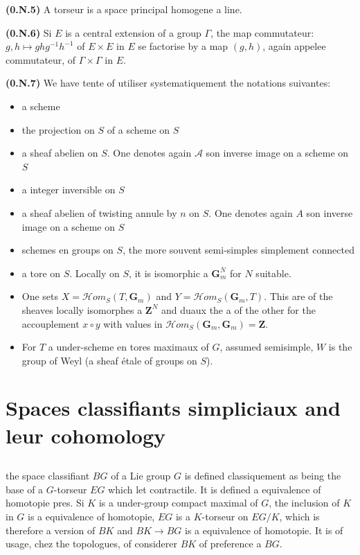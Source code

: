\documentclass[11pt,a4paper]{article}
\theoremstyle{plain}
\theoremstyle{definition}
\begin{document}
\textbf{(0.N.5)} A torseur is a space principal homogene a line.

\textbf{(0.N.6)} Si $E$ is a central extension of a group $\Gamma$, the map commutateur: $g,h \mapsto ghg^{-1}h^{-1}$ of $E \times E$ in $E$ se factorise by a map $(g,h)$, again appelee commutateur, of $\Gamma \times \Gamma$ in $E$.

\textbf{(0.N.7)} We have tente of utiliser systematiquement the notations suivantes:

\begin{itemize}[leftmargin=*]
\item[$S$] a scheme
\item[$a$] the projection on $S$ of a scheme on $S$
\item[$\mathscr{A}$] a sheaf abelien on $S$. One denotes again $\mathscr{A}$ son inverse image on a scheme on $S$
\item[$n$] a integer inversible on $S$
\item[$A$] a sheaf abelien of twisting annule by $n$ on $S$. One denotes again $A$ son inverse image on a scheme on $S$
\item[$G, H$] schemes en groups on $S$, the more souvent semi-simples simplement connected
\item[$T$] a tore on $S$. Locally on $S$, it is isomorphic a $\mathbf{G}_m^N$ for $N$ suitable.
\item[] One sets $X = \mathscr{H}om_S(T, \mathbf{G}_m)$ and $Y = \mathscr{H}om_S(\mathbf{G}_m, T)$. This are of the sheaves locally isomorphes a $\mathbf{Z}^N$ and duaux the a of the other for the accouplement $x \circ y$ with values in $\mathscr{H}om_S(\mathbf{G}_m, \mathbf{G}_m) = \mathbf{Z}$.
\item[] For $T$ a under-scheme en tores maximaux of $G$, assumed semisimple, $W$ is the group of Weyl (a sheaf étale of groups on $S$).
\end{itemize}

\section{Spaces classifiants simpliciaux and leur cohomology}

\subsection{}\label{1.1}

the space classifiant $BG$ of a Lie group $G$ is defined classiquement as being the base of a $G$-torseur $EG$ which let contractile. It is defined a equivalence of homotopie pres. Si $K$ is a under-group compact maximal of $G$, the inclusion of $K$ in $G$ is a equivalence of homotopie, $EG$ is a $K$-torseur on $EG/K$, which is therefore a version of $BK$ and $BK \to BG$ is a equivalence of homotopie. It is of usage, chez the topologues, of considerer $BK$ of preference a $BG$.
\end{document}
